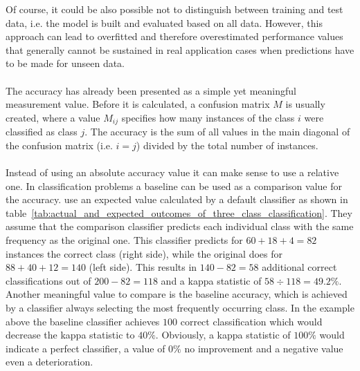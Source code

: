 \documentclass[article,type=msc,colorback,accentcolor=tud7b]{tudthesis}
\begin{document}
    Of course, it could be also possible not to distinguish between training and test data, i.e. the model is built and evaluated based on all data. However, this approach can lead to overfitted and therefore overestimated performance values that generally cannot be sustained in real application cases when predictions have to be made for unseen data. \\\\
    The accuracy has already been presented as a simple yet meaningful measurement value. Before it is calculated, a confusion matrix $M$ is usually created, where a value $M_{ij}$ specifies how many instances of the class $i$ were classified as class $j$. The accuracy is the sum of all values in the main diagonal of the confusion matrix (i.e. $i=j$) divided by the total number of instances. \\\\
Instead of using an absolute accuracy value it can make sense to use a relative one. In classification problems a baseline can be used as a comparison value for the accuracy. \citeauthor{Witten2005} use an expected value calculated by a default classifier as shown in table~\ref{tab:actual_and_expected_outcomes_of_three_class_classification}. They assume that the comparison classifier predicts each individual class with the same frequency as the original one. This classifier predicts for $60+18+4=82$ instances the correct class (right side), while the original does for $88+40+12=140$ (left side). This results in $140-82=58$ additional correct classifications out of $200-82=118$ and a kappa statistic of $58\div118=49.2\%$. Another meaningful value to compare is the baseline accuracy, which is achieved by a classifier always selecting the most frequently occurring class. In the example above the baseline classifier achieves $100$ correct classification which would decrease the kappa statistic to $40\%$. Obviously, a kappa statistic of $100\%$ would indicate a perfect classifier, a value of $0\%$ no improvement and a negative value even a deterioration.
  
\end{document}
